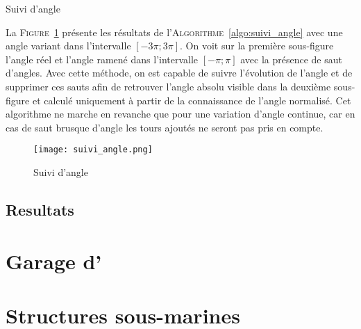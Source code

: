 				\begin{algorithm}[!htb]
			
					\caption{Suivi d'angle} 
					\label{algo:suivi_angle}
				\end{algorithm}
			
				La \textsc{Figure}~\ref{fig:suivi_angle} présente les résultats de l'\textsc{Algorithme}~\ref{algo:suivi_angle} avec une angle variant dans l'intervalle $[-3\pi; 3\pi]$. On voit sur la première sous-figure l'angle réel et l'angle ramené dans l'intervalle $[-\pi; \pi]$ avec la présence de saut d'angles. Avec cette méthode, on est capable de suivre l'évolution de l'angle et de supprimer ces sauts afin de retrouver l'angle absolu visible dans la deuxième sous-figure et calculé uniquement à partir de la connaissance de l'angle normalisé. Cet algorithme ne marche en revanche que pour une variation d'angle continue, car en cas de saut brusque d'angle les tours ajoutés ne seront pas pris en compte.
			
				\begin{figure}[!htb]
					\centering
					\texttt{[image: suivi\_angle.png]}
					\caption{Suivi d'angle}
					\label{fig:suivi_angle}
				\end{figure}
		
		
		\subsection{Resultats}

		\section{Garage d'\argos{}}

		\section{Structures sous-marines}
		